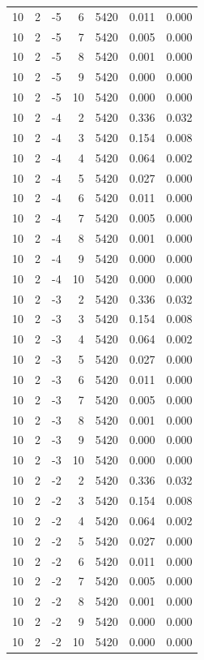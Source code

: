 \begin{table}
\begin{tabular}{rrrrrrr}
10 & 2 & -5 & 6 & 5420 & 0.011 & 0.000 \\
10 & 2 & -5 & 7 & 5420 & 0.005 & 0.000 \\
10 & 2 & -5 & 8 & 5420 & 0.001 & 0.000 \\
10 & 2 & -5 & 9 & 5420 & 0.000 & 0.000 \\
10 & 2 & -5 & 10 & 5420 & 0.000 & 0.000 \\
10 & 2 & -4 & 2 & 5420 & 0.336 & 0.032 \\
10 & 2 & -4 & 3 & 5420 & 0.154 & 0.008 \\
10 & 2 & -4 & 4 & 5420 & 0.064 & 0.002 \\
10 & 2 & -4 & 5 & 5420 & 0.027 & 0.000 \\
10 & 2 & -4 & 6 & 5420 & 0.011 & 0.000 \\
10 & 2 & -4 & 7 & 5420 & 0.005 & 0.000 \\
10 & 2 & -4 & 8 & 5420 & 0.001 & 0.000 \\
10 & 2 & -4 & 9 & 5420 & 0.000 & 0.000 \\
10 & 2 & -4 & 10 & 5420 & 0.000 & 0.000 \\
10 & 2 & -3 & 2 & 5420 & 0.336 & 0.032 \\
10 & 2 & -3 & 3 & 5420 & 0.154 & 0.008 \\
10 & 2 & -3 & 4 & 5420 & 0.064 & 0.002 \\
10 & 2 & -3 & 5 & 5420 & 0.027 & 0.000 \\
10 & 2 & -3 & 6 & 5420 & 0.011 & 0.000 \\
10 & 2 & -3 & 7 & 5420 & 0.005 & 0.000 \\
10 & 2 & -3 & 8 & 5420 & 0.001 & 0.000 \\
10 & 2 & -3 & 9 & 5420 & 0.000 & 0.000 \\
10 & 2 & -3 & 10 & 5420 & 0.000 & 0.000 \\
10 & 2 & -2 & 2 & 5420 & 0.336 & 0.032 \\
10 & 2 & -2 & 3 & 5420 & 0.154 & 0.008 \\
10 & 2 & -2 & 4 & 5420 & 0.064 & 0.002 \\
10 & 2 & -2 & 5 & 5420 & 0.027 & 0.000 \\
10 & 2 & -2 & 6 & 5420 & 0.011 & 0.000 \\
10 & 2 & -2 & 7 & 5420 & 0.005 & 0.000 \\
10 & 2 & -2 & 8 & 5420 & 0.001 & 0.000 \\
10 & 2 & -2 & 9 & 5420 & 0.000 & 0.000 \\
10 & 2 & -2 & 10 & 5420 & 0.000 & 0.000 \\

\end{tabular}
\end{table}
